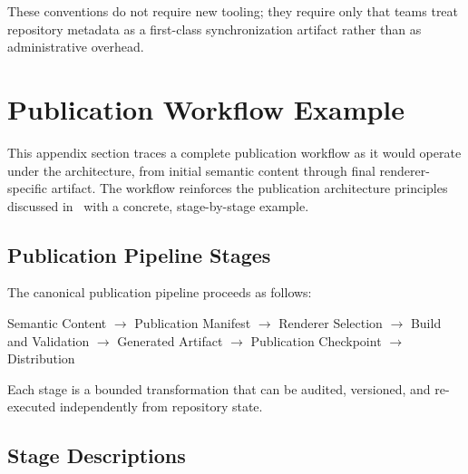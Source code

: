 These conventions do not require new tooling; they require only that teams treat repository metadata as a first-class synchronization artifact rather than as administrative overhead.


\section{Publication Workflow Example}
\label{sec:appendix-publication}

This appendix section traces a complete publication workflow as it would operate under the  architecture, from initial semantic content through final renderer-specific artifact. The workflow reinforces the publication architecture principles discussed in~ with a concrete, stage-by-stage example.

\subsection{Publication Pipeline Stages}

The canonical  publication pipeline proceeds as follows:

\begin{center}
Semantic Content
$\rightarrow$ Publication Manifest
$\rightarrow$ Renderer Selection
$\rightarrow$ Build and Validation
$\rightarrow$ Generated Artifact
$\rightarrow$ Publication Checkpoint
$\rightarrow$ Distribution
\end{center}

Each stage is a bounded transformation that can be audited, versioned, and re-executed independently from repository state.

\subsection{Stage Descriptions}


